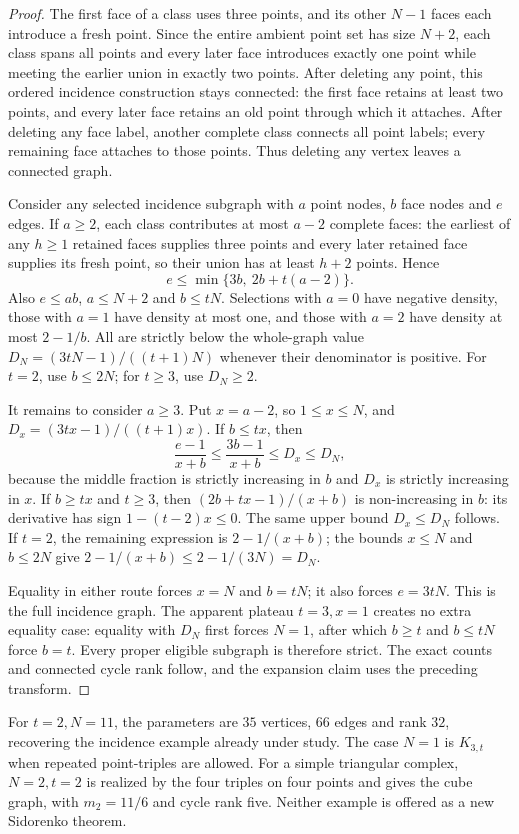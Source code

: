\begin{proof}
The first face of a class uses three points, and its other $N-1$ faces
each introduce a fresh point. Since the entire ambient point set has size
$N+2$, each class spans all points and every later face introduces exactly
one point while meeting the earlier union in exactly two points.
After deleting any point, this ordered incidence construction stays connected:
the first face retains at least two points, and every later face retains an
old point through which it attaches. After deleting any face label, another
complete class connects all point labels; every remaining face attaches to
those points. Thus deleting any vertex leaves a connected graph.

Consider any selected incidence subgraph with $a$ point nodes, $b$ face
nodes and $e$ edges. If $a\ge2$, each class contributes at most $a-2$
complete faces: the earliest of any $h\ge1$ retained faces supplies three
points and every later retained face supplies its fresh point, so their
union has at least $h+2$ points. Hence
\[
 e\le\min\{3b,\ 2b+t(a-2)\}.
\]
Also $e\le ab$, $a\le N+2$ and $b\le tN$. Selections with $a=0$ have
negative density, those with $a=1$ have density at most one, and those
with $a=2$ have density at most $2-1/b$. All are strictly below the
whole-graph value $D_N=(3tN-1)/((t+1)N)$ whenever their denominator is positive.
For $t=2$, use $b\le2N$; for $t\ge3$, use $D_N\ge2$.

It remains to consider $a\ge3$. Put $x=a-2$, so $1\le x\le N$, and
$D_x=(3tx-1)/((t+1)x)$. If $b\le tx$, then
\[
 \frac{e-1}{x+b}\le\frac{3b-1}{x+b}\le D_x\le D_N,
\]
because the middle fraction is strictly increasing in $b$ and $D_x$
is strictly increasing in $x$. If $b\ge tx$ and $t\ge3$, then
$(2b+tx-1)/(x+b)$ is non-increasing in $b$: its derivative has sign
$1-(t-2)x\le0$. The same upper bound $D_x\le D_N$ follows.
If $t=2$, the remaining expression is $2-1/(x+b)$; the bounds
$x\le N$ and $b\le2N$ give $2-1/(x+b)\le2-1/(3N)=D_N$.

Equality in either route forces $x=N$ and $b=tN$; it also forces
$e=3tN$. This is the full incidence graph. The apparent plateau
$t=3,x=1$ creates no extra equality case: equality with $D_N$ first
forces $N=1$, after which $b\ge t$ and $b\le tN$ force $b=t$.
Every proper eligible subgraph is therefore strict. The exact counts
and connected cycle rank follow, and the expansion claim uses the
preceding transform.
\end{proof}

For $t=2,N=11$, the parameters are $35$ vertices, $66$ edges and rank $32$,
recovering the incidence example already under study. The case $N=1$
is $K_{3,t}$ when repeated point-triples are allowed. For a simple
triangular complex, $N=2,t=2$ is realized by the four triples on four
points and gives the cube graph, with $m_2=11/6$ and cycle rank five.
Neither example is offered as a new Sidorenko theorem.

